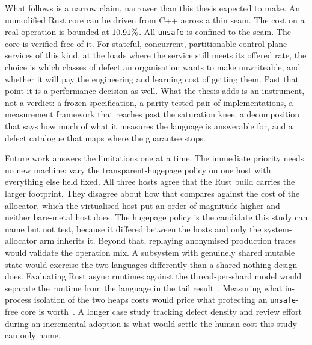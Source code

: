 \documentclass[english,twoside,openright,a4paper,censored,csm,software-track-2020]{HYthesisML}
\begin{document}
What follows is a narrow claim, narrower than this thesis expected to make. An unmodified
Rust core can be driven from C++ across a thin seam. The cost on a real operation is
bounded at $10.91\%$. All \texttt{unsafe} is confined to the seam. The core is
verified free of it. For stateful, concurrent, partitionable control-plane services of
this kind, at the loads where the service still meets its offered rate, the choice is
which classes of defect an organisation wants to make unwriteable, and whether it will
pay the engineering and learning cost of getting them. Past that point it is a
performance decision as well. What the thesis adds is an instrument, not a verdict: a
frozen specification, a parity-tested pair of implementations, a measurement framework
that reaches past the saturation knee, a decomposition that says how much of what it
measures the language is answerable for, and a defect catalogue that maps where the
guarantee stops.

Future work answers the limitations one at a time. The immediate priority needs no new
machine: vary the transparent-hugepage policy on one host with everything else held
fixed. All three hosts agree that the Rust build carries the larger footprint. They
disagree about how that compares against the cost of the allocator, which the virtualised
host put an order of magnitude higher and neither bare-metal host does. The hugepage
policy is the candidate this study can name but not test, because it differed between the
hosts and only the system-allocator arm inherits it. Beyond that, replaying
anonymised production traces would validate the operation mix. A subsystem with
genuinely shared mutable state would exercise the two languages differently than a
shared-nothing design does. Evaluating Rust async runtimes against the thread-per-shard
model would separate the runtime from the language in the tail
result~\cite{arvidsson2025async}. Measuring what in-process isolation of the two heaps
costs would price what protecting an \texttt{unsafe}-free core is
worth~\cite{rivera2021galeed}. A longer case study tracking defect density and review
effort during an incremental adoption is what would settle the human cost this study can
only name.




\cleardoublepage %

\printbibliography
\end{document}
